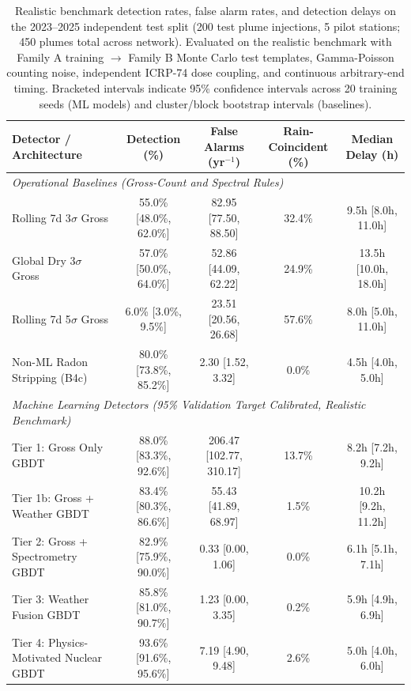 \begin{table}[H]
\caption{Realistic benchmark detection rates, false alarm rates, and detection delays on the 2023--2025 independent test split (200 test plume injections, 5 pilot stations; 450 plumes total across network). Evaluated on the realistic benchmark with Family A training $\to$ Family B Monte Carlo test templates, Gamma-Poisson counting noise, independent ICRP-74 dose coupling, and continuous arbitrary-end timing. Bracketed intervals indicate 95\% confidence intervals across 20 training seeds (ML models) and cluster/block bootstrap intervals (baselines).}
\label{tab:benchmark_summary}
\centering
\small
\begin{tabularx}{\textwidth}{@{}X c c c c@{}}
\toprule
\textbf{Detector / Architecture} & \textbf{Detection (\%)} & \textbf{False Alarms (yr$^{-1}$)} & \textbf{Rain-Coincident (\%)} & \textbf{Median Delay (h)} \\
\midrule
\multicolumn{5}{l}{\textit{Operational Baselines (Gross-Count and Spectral Rules)}} \\[0.2em]
Rolling 7d 3$\sigma$ Gross & 55.0\% [48.0\%, 62.0\%] & 82.95 [77.50, 88.50] & 32.4\% & 9.5h [8.0h, 11.0h] \\
Global Dry 3$\sigma$ Gross & 57.0\% [50.0\%, 64.0\%] & 52.86 [44.09, 62.22] & 24.9\% & 13.5h [10.0h, 18.0h] \\
Rolling 7d 5$\sigma$ Gross & 6.0\% [3.0\%, 9.5\%] & 23.51 [20.56, 26.68] & 57.6\% & 8.0h [5.0h, 11.0h] \\
Non-ML Radon Stripping (B4c) & 80.0\% [73.8\%, 85.2\%] & 2.30 [1.52, 3.32] & 0.0\% & 4.5h [4.0h, 5.0h] \\
\midrule
\multicolumn{5}{l}{\textit{Machine Learning Detectors (95\% Validation Target Calibrated, Realistic Benchmark)}} \\[0.2em]
Tier 1: Gross Only GBDT & 88.0\% [83.3\%, 92.6\%] & 206.47 [102.77, 310.17] & 13.7\% & 8.2h [7.2h, 9.2h] \\
Tier 1b: Gross + Weather GBDT & 83.4\% [80.3\%, 86.6\%] & 55.43 [41.89, 68.97] & 1.5\% & 10.2h [9.2h, 11.2h] \\
Tier 2: Gross + Spectrometry GBDT & 82.9\% [75.9\%, 90.0\%] & 0.33 [0.00, 1.06] & 0.0\% & 6.1h [5.1h, 7.1h] \\
Tier 3: Weather Fusion GBDT & 85.8\% [81.0\%, 90.7\%] & 1.23 [0.00, 3.35] & 0.2\% & 5.9h [4.9h, 6.9h] \\
Tier 4: Physics-Motivated Nuclear GBDT & 93.6\% [91.6\%, 95.6\%] & 7.19 [4.90, 9.48] & 2.6\% & 5.0h [4.0h, 6.0h] \\
\bottomrule
\end{tabularx}
\end{table}
